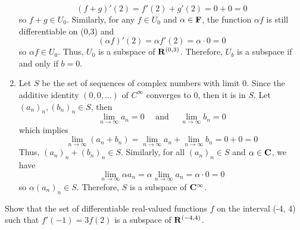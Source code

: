 \begin{solution}
\begin{enumerate}[label=(\alph*)]
        $$(f+g)'(2) = f'(2) + g'(2) = 0 + 0 = 0$$
        so $f+g \in U_0$. Similarly, for any $f \in U_0$ and $\alpha \in \mathbf{F}$, the function $\alpha f$ is still differentiable on (0,3) and 
        $$(\alpha f)'(2) = \alpha f'(2) = \alpha \cdot 0 = 0$$
        so $\alpha f \in U_0$. Thus, $U_0$ is a subspace of $\mathbf{R}^{(0,3)}$. Therefore, $U_b$ is a subspace if and only if $b=0$.
        \item Let $S$ be the set of sequences of complex numbers with limit 0. Since the additive identity $(0,0,...)$ of $C^{\infty}$ converges to 0, then it is in $S$. Let $(a_n)_n, (b_n)_n \in S$, then
        $$\lim_{n \rightarrow \infty}a_n = 0 \quad \text{ and } \quad \lim_{n \rightarrow \infty}b_n = 0$$
        which implies
        $$\lim_{n \rightarrow \infty}(a_n+b_n) = \lim_{n \rightarrow \infty}a_n + \lim_{n \rightarrow \infty}b_n = 0+0 = 0$$
        Thus, $(a_n)_n + (b_n)_n \in S$. Similarly, for all $(a_n)_n \in S$ and $\alpha \in \mathbf{C}$, we have
        $$\lim_{n \rightarrow \infty}\alpha a_n = \alpha \lim_{n \rightarrow \infty}a_n = \alpha \cdot 0 = 0 $$
        so $\alpha (a_n)_n \in S$. Therefore, $S$ is a subspace of $\mathbf{C}^{\infty}$. \\
    \end{enumerate}
\end{solution}

\begin{exercise}
    Show that the set of differentiable real-valued functions $f$ on the interval (-4, 4) such that $f'(-1) = 3f(2)$ is a subspace of $\mathbf{R}^{(-4,4)}$.\\
\end{exercise}

